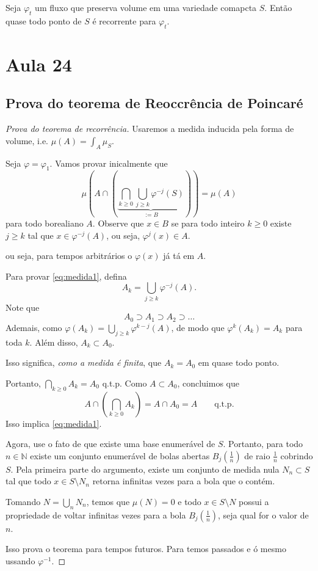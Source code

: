 \begin{thm}\leavevmode
	Seja $\varphi_t$ um fluxo que preserva volume em uma variedade comapcta $S$. Então quase todo ponto de  $S$ é recorrente para $\varphi_t$.
	
\end{thm}
\section{Aula 24}

\subsection{Prova do teorema de Reoccrência de Poincaré}

\begin{proof}[Prova do teorema de recorrência]\leavevmode
Usaremos a medida inducida pela forma de volume, i.e. $\mu(A)=\int_{A}\mu_S$.

Seja $\varphi=\varphi_1$. Vamos provar inicalmente que
\begin{equation}\label{eq:medida1}\mu\left(A\cap\left( \underbrace{\bigcap_{k\geq 0} \bigcup_{j\geq k} \varphi^{-j}(S)}_{:=B} \right) \right)=\mu(A)
\end{equation}
para todo borealiano $A$. Observe que $x\in B$ se para todo inteiro $k \geq 0$ existe $j\geq k$ tal que $x\in \varphi^{-j}(A)$, ou seja, $\varphi^j(x)\in A$.

 {\color{4}ou seja, para tempos arbitrários o $\varphi(x)$ já tá em $A$.}

 Para provar \cref{eq:medida1}, defina
 \[A_k=\bigcup_{j\geq k} \varphi^{-j}(A).\]
 Note que 
 \[A_0\supset A_1\supset A_2\supset \ldots\]
 Ademais, como $\varphi(A_k)=\bigcup_{j \geq k}\varphi^{k-j}(A)$, de modo que $\varphi^k(A_k)=A_k$ para toda $k$. Além disso, $A_k\subset A_0$.

 Isso significa, \textit{como a medida é finita}, que $A_k=A_0$ em quase todo ponto.

 Portanto, $\bigcap_{k\geq 0} A_k=A_0$ q.t.p. Como $A\subset A_0$, concluimos que
 \[A\cap\left( \bigcap_{k\geq 0} A_k \right) =A\cap A_0=A \qquad \text{q.t.p.} \]
Isso implica \cref{eq:medida1}.

Agora, use o fato de que existe uma base enumerável de $S$. Portanto, para todo $n\in \mathbb{N}$ existe um conjunto enumerável de bolas abertas $B_j(\frac{1}{n})$ de raio $\frac{1}{n}$ cobrindo $S$. Pela primeira parte do argumento, existe um conjunto de medida nula $N_n \subset S$ tal que todo $x\in S\setminus N_n$ retorna infinitas vezes para a bola que o contém.

Tomando $N=\bigcup_{n} N_n$, temos que $\mu(N)=0$ e todo $x\in S\setminus N$ possui a propriedade de voltar infinitas vezes para  a bola  $B_j(\frac{1}{n})$, seja qual for o valor de $n$.

Isso prova o teorema para tempos futuros. Para temos passados e ó mesmo ussando $\varphi^{-1}$.
\end{proof}

